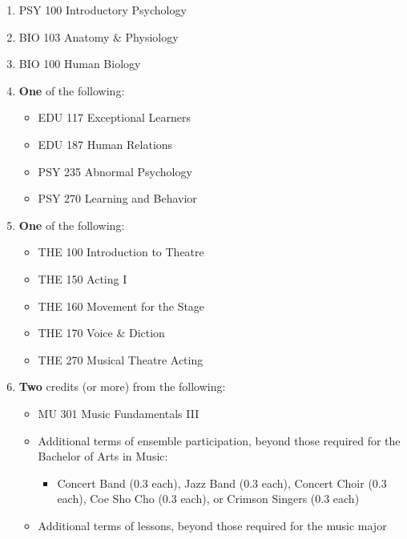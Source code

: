 \documentclass[
  letterpaper,
]{scrbook}
\providecommand{\tightlist}{%
  \setlength{\itemsep}{0pt}\setlength{\parskip}{0pt}}
\begin{document}
\begin{enumerate}
\def\labelenumi{\arabic{enumi}.}
\tightlist
\item
  PSY 100 Introductory Psychology\\
\item
  BIO 103 Anatomy \& Physiology\\
\item
  BIO 100 Human Biology\\
\item
  \textbf{One} of the following:

  \begin{itemize}
  \tightlist
  \item
    EDU 117 Exceptional Learners\\
  \item
    EDU 187 Human Relations\\
  \item
    PSY 235 Abnormal Psychology\\
  \item
    PSY 270 Learning and Behavior\\
  \end{itemize}
\item
  \textbf{One} of the following:

  \begin{itemize}
  \tightlist
  \item
    THE 100 Introduction to Theatre\\
  \item
    THE 150 Acting I\\
  \item
    THE 160 Movement for the Stage\\
  \item
    THE 170 Voice \& Diction\\
  \item
    THE 270 Musical Theatre Acting\\
  \end{itemize}
\item
  \textbf{Two} credits (or more) from the following:

  \begin{itemize}
  \tightlist
  \item
    MU 301 Music Fundamentals III\\
  \item
    Additional terms of ensemble participation, beyond those required
    for the Bachelor of Arts in Music:

    \begin{itemize}
    \tightlist
    \item
      Concert Band (0.3 each), Jazz Band (0.3 each), Concert Choir (0.3
      each), Coe Sho Cho (0.3 each), or Crimson Singers (0.3 each)\\
    \end{itemize}
  \item
    Additional terms of lessons, beyond those required for the music
    major
  \end{itemize}
\end{enumerate}
\end{document}
